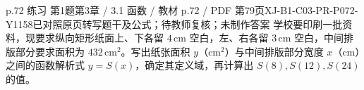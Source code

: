 \par\noindent\begin{minipage}{\linewidth}
\begin{bankitem}{p.72 练习 第1题}{第3章 / 3.1 函数 / 教材 p.72 / PDF 第79页}{XJ-B1-C03-PR-P072-Y1158}{已对照原页转写题干及公式；待教师复核；未制作答案}
学校要印刷一批资料，现要求纵向矩形纸面上、下各留 $4\,\mathrm{cm}$ 空白，左、右各留 $3\,\mathrm{cm}$ 空白，中间排版部分要求面积为 $432\,\mathrm{cm^2}$。写出纸张面积 $y$（$\mathrm{cm^2}$）与中间排版部分宽度 $x$（$\mathrm{cm}$）之间的函数解析式 $y=S(x)$，确定其定义域，再计算出 $S(8),S(12),S(24)$ 的值。
\end{bankitem}
\end{minipage}\par\medskip
